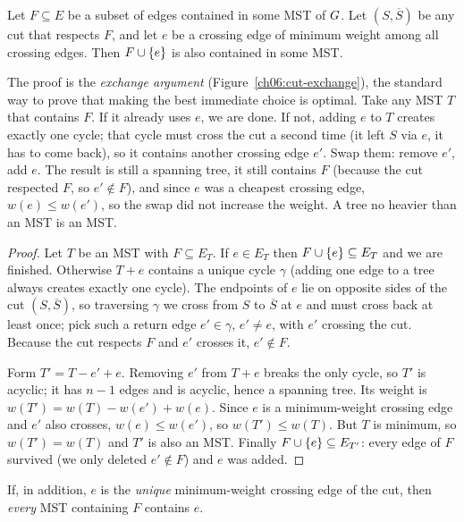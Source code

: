 \begin{theorem}
\label{ch06:cut-property}
Let $F\subseteq E$ be a subset of edges contained in some MST of $G$. Let $(S,\overline S)$ be any cut that respects $F$, and let $e$ be a crossing edge of minimum weight among all crossing edges. Then $F\cup\{e\}$ is also contained in some MST.
\end{theorem}

\begin{whybox}
The proof is the \emph{exchange argument} (Figure~\ref{ch06:cut-exchange}), the standard way to prove that making the best immediate choice is optimal. Take any MST $T$ that contains $F$. If it already uses $e$, we are done. If not, adding $e$ to $T$ creates exactly one cycle; that cycle must cross the cut a second time (it left $S$ via $e$, it has to come back), so it contains another crossing edge $e'$. Swap them: remove $e'$, add $e$. The result is still a spanning tree, it still contains $F$ (because the cut respected $F$, so $e'\notin F$), and since $e$ was a cheapest crossing edge, $w(e)\le w(e')$, so the swap did not increase the weight. A tree no heavier than an MST is an MST.
\end{whybox}

\begin{proof}
Let $T$ be an MST with $F\subseteq E_T$. If $e\in E_T$ then $F\cup\{e\}\subseteq E_T$ and we are finished. Otherwise $T+e$ contains a unique cycle $\gamma$ (adding one edge to a tree always creates exactly one cycle). The endpoints of $e$ lie on opposite sides of the cut $(S,\overline S)$, so traversing $\gamma$ we cross from $S$ to $\overline S$ at $e$ and must cross back at least once; pick such a return edge $e'\in\gamma$, $e'\ne e$, with $e'$ crossing the cut. Because the cut respects $F$ and $e'$ crosses it, $e'\notin F$.

Form $T'=T-e'+e$. Removing $e'$ from $T+e$ breaks the only cycle, so $T'$ is acyclic; it has $n-1$ edges and is acyclic, hence a spanning tree. Its weight is $w(T')=w(T)-w(e')+w(e)$. Since $e$ is a minimum-weight crossing edge and $e'$ also crosses, $w(e)\le w(e')$, so $w(T')\le w(T)$. But $T$ is minimum, so $w(T')=w(T)$ and $T'$ is also an MST. Finally $F\cup\{e\}\subseteq E_{T'}$: every edge of $F$ survived (we only deleted $e'\notin F$) and $e$ was added.
\end{proof}

\begin{corollary}
\label{ch06:cut-sharp}
If, in addition, $e$ is the \emph{unique} minimum-weight crossing edge of the cut, then \emph{every} MST containing $F$ contains $e$.
\end{corollary}

